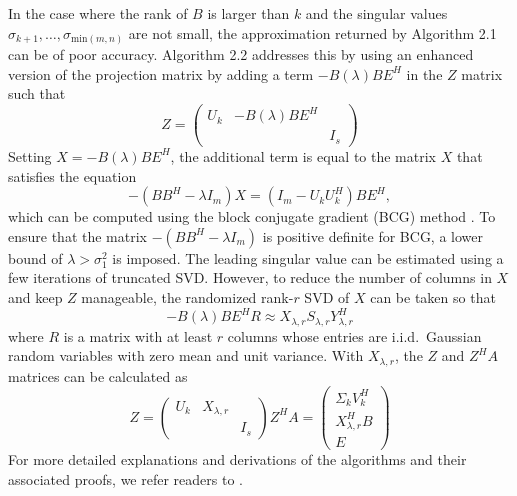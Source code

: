 In the case where the rank of $B$ is larger than $k$ and the singular values $\sigma_{k+1},\dots,\sigma_{\text{min}(m,n)}$ are not small, the approximation returned by Algorithm 2.1 can be of poor accuracy. Algorithm 2.2 addresses this by using an enhanced version of the projection matrix by adding a term $-B(\lambda) B E^H$ in the $Z$ matrix such that
\begin{equation}
  Z = \begin{pmatrix}
    U_k & -B(\lambda) B E^H & \\
    & & I_s
  \end{pmatrix}
\end{equation}
Setting $X = -B(\lambda) B E^H$, the additional term is equal to the matrix $X$ that satisfies the equation
\begin{equation}
    -(B B^H - \lambda I_m) X = (I_m - U_k U_k^H) B E^H,
    \label{eq:bcg}
\end{equation}
which can be computed using the block conjugate gradient (BCG) method \cite{OLeary1980}.
To ensure that the matrix $-(B B^H - \lambda I_m)$ is positive definite for BCG, a lower bound of $\lambda > \sigma_1^2$ is imposed. The leading singular value can be estimated using a few iterations of truncated SVD. However, to reduce the number of columns in $X$ and keep $Z$ manageable, the randomized rank-$r$ SVD of $X$ can be taken so that 
\begin{equation}
    -B(\lambda) B E^H R \approx X_{\lambda,r} S_{\lambda,r} Y_{\lambda,r}^H
    \label{eq:bcg_rsvd}
\end{equation}
where $R$ is a matrix with at least $r$ columns whose entries are i.i.d.\ Gaussian random variables with zero mean and unit variance. With $X_{\lambda,r}$, the $Z$ and $Z^H A$ matrices can be calculated as
\begin{subequations}
\begin{equation}
  Z = \begin{pmatrix}
    U_k & X_{\lambda,r} & \\
    & & I_s
  \end{pmatrix}
  \label{eq:enhanced_Z}
\end{equation}
\begin{equation}
  Z^H A =
  \begin{pmatrix}
    \Sigma_k V_k^H \\
    X_{\lambda,r}^H B \\
    E
  \end{pmatrix}
  \label{eq:enhanced_ZHA}
\end{equation}
\label{eq:enhanced_matrices}
\end{subequations}
For more detailed explanations and derivations of the algorithms and their associated proofs, we refer readers to \cite{Kalantzis2021}.
